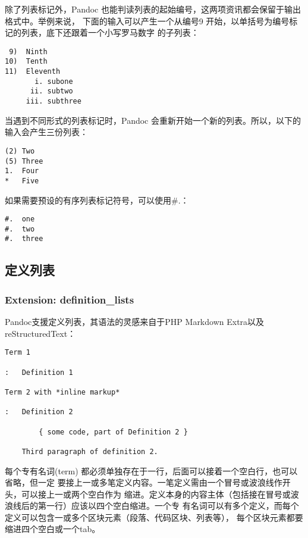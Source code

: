 \documentclass[fancyhdr,bookmark]{ctexbook}
\begin{document}
除了列表标记外，Pandoc
也能判读列表的起始编号，这两项资讯都会保留于输出格式中。举例来说，
下面的输入可以产生一个从编号9
开始，以单括号为编号标记的列表，底下还跟着一个小写罗马数字 的子列表：

\begin{lstlisting}
 9)  Ninth
10)  Tenth
11)  Eleventh
       i. subone
      ii. subtwo
     iii. subthree
\end{lstlisting}

当遇到不同形式的列表标记时，Pandoc
会重新开始一个新的列表。所以，以下的输入会产生三份列表：

\begin{lstlisting}
(2) Two
(5) Three
1.  Four
*   Five
\end{lstlisting}

如果需要预设的有序列表标记符号，可以使用\#.：

\begin{lstlisting}
#.  one
#.  two
#.  three
\end{lstlisting}

\subsection{定义列表}\label{ux5b9aux4e49ux5217ux8868}

\subsubsection{Extension:
definition\_lists}\label{extension-definitionux5flists}

Pandoc支援定义列表，其语法的灵感来自于PHP Markdown
Extra以及reStructuredText：

\begin{lstlisting}
Term 1

:   Definition 1

Term 2 with *inline markup*

:   Definition 2

        { some code, part of Definition 2 }

    Third paragraph of definition 2.
\end{lstlisting}

每个专有名词(term)
都必须单独存在于一行，后面可以接着一个空白行，也可以省略，但一定
要接上一或多笔定义内容。一笔定义需由一个冒号或波浪线作开头，可以接上一或两个空白作为
缩进。定义本身的内容主体（包括接在冒号或波浪线后的第一行）应该以四个空白缩进。一个专
有名词可以有多个定义，而每个定义可以包含一或多个区块元素（段落、代码区块、列表等），
每个区块元素都要缩进四个空白或一个tab。
\end{document}
